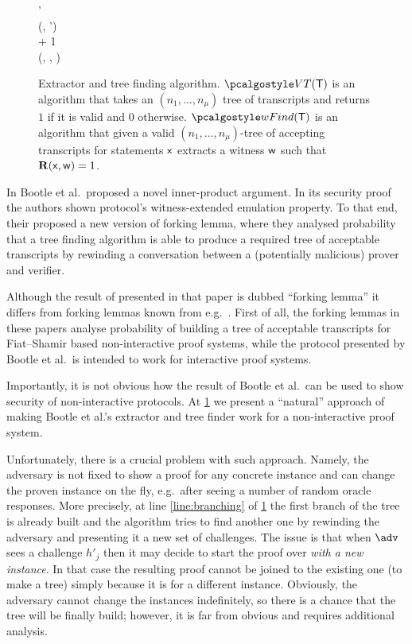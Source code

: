 \documentclass[runningheads,11pt]{llncs}
\theoremstyle{definition} \newtheorem{definition}[theorem]{Definition}
\begin{document}
\begin{figure}
{{      \pcind \pcif \tree' \neq \bot \pcthen \\
      \pcind \pcind \tree \gets (\tree, \tree') \\
      \pcind \pcind \counter \gets \counter + 1\\
      \pcreturn (\inp, \zkproof, \tree)
    }
  }
  \caption{Extractor and tree finding algorithm. $\validtree(\tree)$ is
    an algorithm that takes an $(n_1, \ldots, n_\mu)$ tree of transcripts and
    returns $1$ if it is valid and $0$ otherwise. $\findwitness(\tree)$ is an
    algorithm that given a valid $(n_1, \ldots, n_\mu)$-tree of accepting
    transcripts for statements $\mathsf{x}$ extracts a witness $\mathsf{w}$ such that
    $\mathbf{R}(\mathsf{x}, \mathsf{w}) = 1$.
  }
  \label{fig:extractor_and_tree_finding_algorithm}
\end{figure}
In \cite{EC:BCCGP16} Bootle et al.~proposed a novel inner-product argument. In
its security proof the authors shown protocol's witness-extended emulation
property. To that end, their proposed a new version of forking lemma, where they
analysed probability that a tree finding algorithm is able to produce a required
tree of acceptable transcripts by rewinding a conversation between a
(potentially malicious) prover and verifier.

Although the result of presented in that paper is dubbed ``forking lemma'' it
differs from forking lemmas known from e.g.~\cite{JC:PoiSte00,CCS:BelNev06}.
First of all, the forking lemmas in these papers analyse probability of building
a tree of acceptable transcripts for Fiat--Shamir based non-interactive proof
systems, while the protocol presented by Bootle et al.~is intended to work for
interactive proof systems.

Importantly, it is not obvious how the result of Bootle et al.~can be used to
show security of non-interactive protocols. At
\cref{fig:extractor_and_tree_finding_algorithm} we present a ``natural''
approach of making Bootle et al.'s extractor and tree finder work for a
non-interactive proof system.

Unfortunately, there is a crucial problem with such approach. Namely, the
adversary is not fixed to show a proof for any concrete instance and can change
the proven instance on the fly, e.g.~after seeing a number of random oracle
responses. More precisely, at line \ref{line:branching} of
\cref{fig:extractor_and_tree_finding_algorithm} the first branch of the tree is
already built and the algorithm tries to find another one by rewinding the
adversary and presenting it a new set of challenges. The issue is that when
$\adv$ sees a challenge $h'_j$ then it may decide to start the proof over
\emph{with a new instance}. In that case the resulting proof cannot be joined to
the existing one (to make a tree) simply because it is for a different instance.
Obviously, the adversary cannot change the instances indefinitely, so there is a
chance that the tree will be finally build; however, it is far from obvious and
requires additional analysis.
\end{document}
